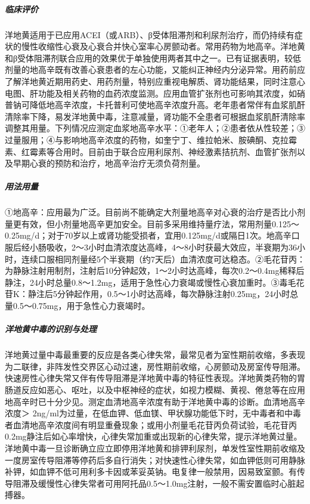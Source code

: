 \subparagraph{临床评价}

洋地黄适用于已应用ACEI（或ARB）、β受体阻滞剂和利尿剂治疗，而仍持续有症状的慢性收缩性心衰及心衰合并快心室率心房颤动者。常用药物为地高辛。洋地黄和β受体阻滞剂联合应用的效果优于单独使用两者其中之一。已有证据表明，较低剂量的地高辛既有改善心衰患者的左心功能，又能纠正神经内分泌异常。用药前应了解洋地黄近期用药史、用药剂量，特别应重视电解质、肾功能结果，同时注意心电图、肝功能及相关药物的血药浓度监测。应用血管扩张剂也可影响其浓度，如硝普钠可降低地高辛浓度，卡托普利可使地高辛浓度升高。老年患者常伴有血浆肌酐清除率下降，易发洋地黄中毒，注意减量，肾功能不全患者可根据血浆肌酐清除率调整其用量。下列情况应测定血浆地高辛水平：①老年人；②患者依从性较差；③过量服用；④与影响地高辛浓度的药物，如奎宁丁、维拉帕米、胺碘酮、克拉霉素、红霉素等合用时。目前由于联合应用利尿剂、神经激素拮抗剂、血管扩张剂以及早期心衰的预防和治疗，地高辛治疗无须负荷剂量。

\subparagraph{用法用量}

①地高辛：应用最为广泛。目前尚不能确定大剂量地高辛对心衰的治疗是否比小剂量更有效，但小剂量地高辛更加安全。目前多采用维持量疗法，常用剂量0.125～0.25mg/d；对于70岁以上或肾功能受损者，宜用0.125mg/d或隔日1次。地高辛口服后经小肠吸收，2～3小时血清浓度达高峰，4～8小时获最大效应，半衰期为36小时，连续口服相同剂量经5个半衰期（约7天后）血清浓度可达稳态。②毛花苷丙：为静脉注射用制剂，注射后10分钟起效，1～2小时达高峰，每次0.2～0.4mg稀释后静注，24小时总量0.8～1.2mg，适用于急性心力衰竭或慢性心衰加重时。③毒毛花苷K：静注后5分钟起作用，0.5～1小时达高峰，每次静脉注射0.25mg，24小时总量0.5～0.75mg，用于急性心力衰竭时。

\subparagraph{洋地黄中毒的识别与处理}

洋地黄过量中毒最重要的反应是各类心律失常，最常见者为室性期前收缩，多表现为二联律，非阵发性交界区心动过速，房性期前收缩，心房颤动及房室传导阻滞。快速房性心律失常又伴有传导阻滞是洋地黄中毒的特征性表现。洋地黄类药物的胃肠道反应如恶心、呕吐，以及中枢神经的症状，如视力模糊、黄视、倦怠等在应用地高辛时已十分少见。测定血清地高辛浓度有助于洋地黄中毒的诊断。血清地高辛浓度＞
2ng/ml为过量，在低血钾、低血镁、甲状腺功能低下时，无中毒者和中毒者血清地高辛浓度间有明显重叠现象；或用小剂量毛花苷丙负荷试验，毛花苷丙0.2mg静注后如心率增快，心律失常加重或出现新的心律失常，提示洋地黄过量。洋地黄中毒一旦诊断确立应立即停用洋地黄和排钾利尿剂，单发性室性期前收缩及一度房室传导阻滞等停药后多自行消失；对快速性心律失常，如血钾低则可用静脉补钾，如血钾不低可用利多卡因或苯妥英钠。电复律一般禁用，因易致室颤。有传导阻滞及缓慢性心律失常者可用阿托品0.5～1.0mg注射，一般不需安置临时心脏起搏器。

